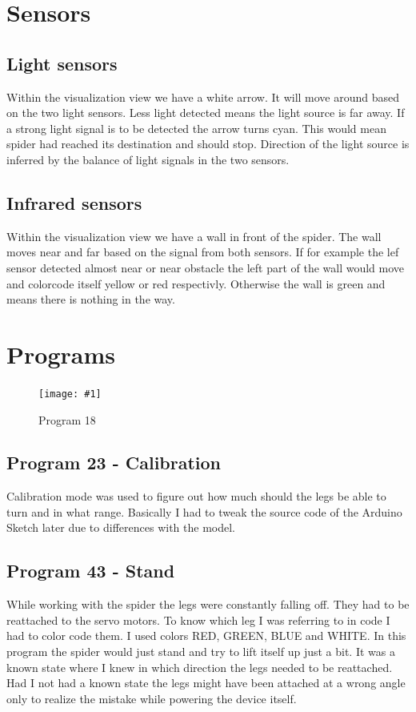 \documentclass[12pt,leqno]{book}
\newcommand{\png}[1]{\texttt{[image: \#1]}}
\newcommand{\figpng}[2]{\begin{figure}[htb]\centering\png{#1}\caption{#2}\end{figure}}
\begin{document}
\section{Sensors}

\subsection{Light sensors}
Within the visualization view we have a white arrow. It will move around based on the two light sensors. Less light detected means the light source is far away. If a strong light signal is to be detected the arrow turns cyan. This would mean spider had reached its destination and should stop. Direction of the light source is inferred by the balance of light signals in the two sensors.

\subsection{Infrared sensors}
Within the visualization view we have a wall in front of the spider. The wall moves near and far based on the signal from both sensors.
If for example the lef sensor detected almost near or near obstacle the left part of the wall would move and colorcode itself yellow or red respectivly. Otherwise the wall is green and means there is nothing in the way.

\section{Programs}

\figpng{Images/A_string_from_JavaScript._-_Google_Chrome-2012-03-15_07.01.55}
{Program 18}

\subsection{Program 23 - Calibration}
Calibration mode was used to figure out how much should the legs be able to turn and in what range. Basically I had to tweak the
source code of the Arduino Sketch later due to differences with the model.
\subsection{Program 43 - Stand}
While working with the spider the legs were constantly falling off. They had to be reattached to the servo motors. To know which
leg I was referring to in code I had to color code them. I used colors RED, GREEN, BLUE and WHITE. In this program the spider 
would just stand and try to lift itself up just a bit. It was a known state where I knew in which direction the legs needed to be reattached. Had I not had a known state the legs might have been attached at a wrong angle only to realize the mistake while
powering the device itself.
\end{document}
